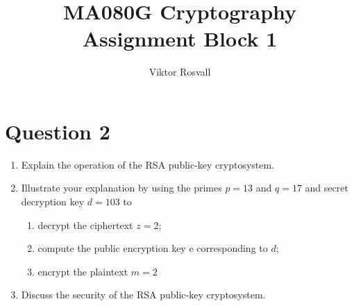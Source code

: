 \documentclass{article}
\title{MA080G Cryptography Assignment Block 1}
\author{Viktor Rosvall}
\begin{document}
	\maketitle
	
	\section*{Question 2}
	\renewcommand{\theenumi}{\alph{enumi}}
	\renewcommand{\theenumii}{\roman{enumii}}
	\begin{enumerate}
		\item Explain the operation of the RSA public-key cryptosystem.
		
		\item Illustrate your explanation by using the primes $p = 13$ and $q = 17$ and secret decryption key $d = 103$ to
		\begin{enumerate}
			\item  decrypt the ciphertext $z = 2$;
			\item compute the public encryption key e corresponding to $d$;
			\item  encrypt the plaintext $m = 2$
  		\end{enumerate}
  	
  	\item Discuss the security of the RSA public-key cryptosystem.
	\end{enumerate}	
\end{document}
